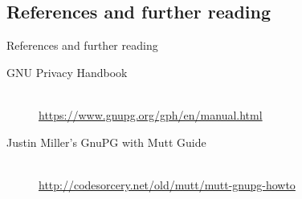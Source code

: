 \documentclass[hyperref={colorlinks=true}]{beamer}
\begin{document}
\subsection{References and further reading}
\begin{frame}{References and further reading}
  \begin{description}
    \item[GNU Privacy Handbook] \hfill \\
\href{https://www.gnupg.org/gph/en/manual.html}
{https://www.gnupg.org/gph/en/manual.html}
    \item[Justin Miller's GnuPG with Mutt Guide] \hfill \\
\href{http://codesorcery.net/old/mutt/mutt-gnupg-howto}
{http://codesorcery.net/old/mutt/mutt-gnupg-howto}
  \end{description}
\end{frame}
\end{document}
